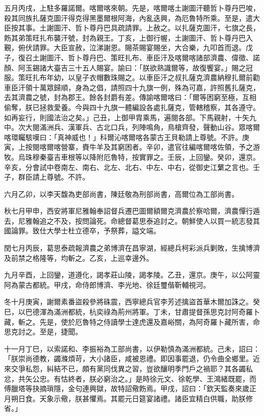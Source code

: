 \begin{pinyinscope}
五月丙戌，上駐多羅諾爾。喀爾喀來朝。先是，喀爾喀土謝圖汗聽哲卜尊丹巴唆，殺其同族扎薩克圖汗得克得黑墨爾根阿海，內亂迭興，為厄魯特所乘。至是，遣大臣按其事。土謝圖汗、哲卜尊丹巴具疏請罪。上赦之。以扎薩克圖汗，七旗之長，飭其弟策旺扎布襲汗號，封為親王。丁亥，上御行幄，土謝圖汗、哲卜尊丹巴入覲，俯伏請罪。大臣宣赦，泣涕謝恩。賜茶賜宴賜坐，大合樂，九叩首而退。戊子，復召土謝圖汗、哲卜尊丹巴、策旺扎布、車臣汗及喀爾喀諸部濟農、偉徵、諾顏、阿玉錫諸大臺吉三十五人賜宴。諭曰：「朕欲熟識爾等，故復饗宴。」賜之冠服。策旺扎布年幼，以皇子衣帽數珠賜之。以車臣汗之叔扎薩克濟農納穆扎爾前勸車臣汗領十萬眾歸順，身為之倡，請照四十九旗一例，殊為可嘉，許照舊扎薩克，去其濟農之號，封為郡王。餘各封爵有差。傳諭喀爾喀曰：「爾等困窮至極，互相偷奪，朕已拯救愛養。今與四十九旗一體編設各處扎薩克，管轄稽察，其各遵守。如再妄行，則國法治之矣。」己丑，上御甲胄乘馬，遍閱各部。下馬親射，十矢九中。次大閱滿洲兵、漢軍兵、古北口兵，列陣鳴角，鳥槍齊發，聲動山谷。眾喀爾喀環矚駭嘆曰：「真神威也！」科爾沁喀爾喀各蒙古王貝勒請上尊號。不許。庚寅，上按閱喀爾喀營寨，賚牛羊及其窮困者。辛卯，遣官往編喀爾喀佐領，予之游牧。烏珠穆秦臺吉車根等以降附厄魯特，按實罪之。壬辰，上回鑾。癸卯，還京。辛亥，分會試中卷南左、南右、北左、北右、中左、中右，從御史江蘩之言也。壬子，群臣請上尊號。不許。

六月乙卯，以李天馥為吏部尚書，陳廷敬為刑部尚書，高爾位為工部尚書。

秋七月甲申，西安將軍尼雅翰奉詔督兵遷巴圖爾額爾克濟農於察哈爾，濟農憚行遁去，尼雅翰追之不及，按問論死。命總督葛思泰追討之。朝鮮使人以買一統志發其國論罪。致仕大學士杜立德卒，予祭葬，謚文端。

閏七月丙辰，葛思泰疏報濟農之弟博濟在昌寧湖，經總兵柯彩派兵剿敗，生擒博濟及前禁之格隆等，均斬之。乙亥，上巡幸邊外。

九月辛酉，上回鑾，道遵化，謁孝莊山陵，謁孝陵。乙丑，還京。庚午，以公阿靈阿為蒙古都統。甲戌，命侍郎博濟、李光地、徐廷璽偕靳輔視河。

冬十月庚寅，謝爾素番盜殺參將硃震，西寧總兵官李芳述擒盜首華木爾加誅之。癸巳，以巴德渾為滿洲都統，杭奕祿為荊州將軍。丁未，甘肅提督孫思克討阿奇羅卜藏，斬之。先是，使於厄魯特之侍讀學士達虎還及嘉峪關，為阿奇羅卜藏所害，命思克討之。至是，捷聞。

十一月丁巳，以索諾和、李振裕為工部尚書，以伊勒慎為滿洲都統。己未，詔曰：「朕崇尚德教，蠲滌煩苛，大小諸臣，咸被恩禮。即因事罷退，仍令曲全鄉里。近來交爭私怨，糾結不已，頗有黨同伐異之習，豈欲釀明季門戶之禍耶？其各蠲私忿，共矢公忠。有怙終者，朕必窮治之。」是時徐元文、徐乾學、王鴻緒既罷，而傅臘塔等抉摘瑣隱，金句連興獄，故特詔儆飭焉。甲戌，詔曰：「欽天監奏來歲正月朔日食。天象示儆，朕甚懼焉。其罷元日筵宴諸禮。諸臣宜精白供職，助朕修省。」


\end{pinyinscope}
